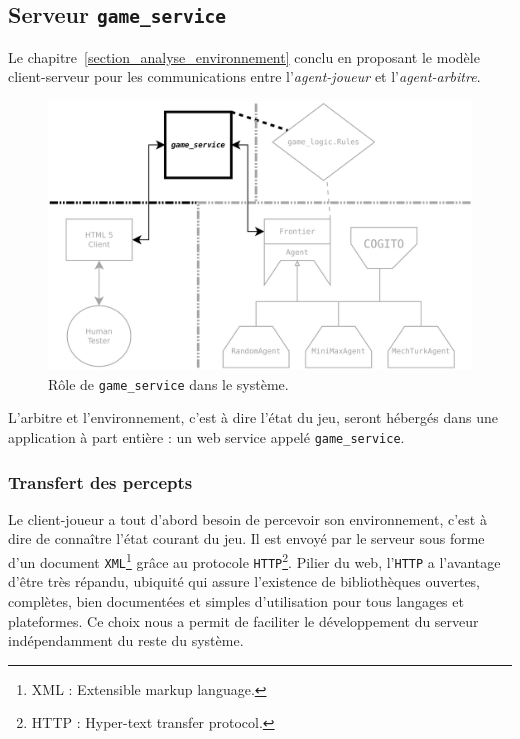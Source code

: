 \subsection{Serveur \texttt{game\_service}}
Le chapitre~\ref{section_analyse_environnement} conclu en proposant le modèle client-serveur pour les communications entre l'\emph{agent-joueur} et l'\emph{agent-arbitre}.

\begin{figure}[H] 
\centering
\includegraphics[width=\textwidth]{files/william/archi_serveur} 
\caption{Rôle de \texttt{game\_service} dans le système.} 
\end{figure}

L'arbitre et l'environnement, c'est à dire l'état du jeu, seront hébergés dans une application à part entière : un \og web service \fg{} appelé \texttt{game\_service}.
\subsubsection{Transfert des percepts}
Le client-joueur a tout d'abord besoin de percevoir son environnement, c'est à dire de connaître l'état courant du jeu. Il est envoyé par le serveur sous forme d'un  document \texttt{XML}\footnote{ XML : Extensible markup language. } grâce au protocole \texttt{HTTP}\footnote{ HTTP : Hyper-text transfer  protocol. }. Pilier du web, l'\texttt{HTTP} a l'avantage d'être très  répandu, ubiquité qui assure l'existence de bibliothèques ouvertes,  complètes, bien documentées et simples d'utilisation pour tous langages et plateformes. Ce choix nous a permit de faciliter le développement du serveur indépendamment du reste du système.
